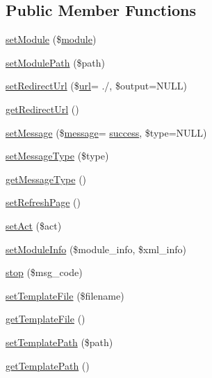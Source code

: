 \subsection*{Public Member Functions}
\begin{DoxyCompactItemize}
\item 
\hyperlink{classModuleObject_a610f40078a4c8590452eaedf794350ed}{set\+Module} (\$\hyperlink{classmodule}{module})
\item 
\hyperlink{classModuleObject_a277cebf9e472c1af7c00eab68414a567}{set\+Module\+Path} (\$path)
\item 
\hyperlink{classModuleObject_ac5126aa7f57a52e7f26b18b9040f5501}{set\+Redirect\+Url} (\$\hyperlink{swfupload_8js_a440a52a9004fdab0700100a6ddb49f67}{url}= \textquotesingle{}./\textquotesingle{}, \$output=N\+U\+LL)
\item 
\hyperlink{classModuleObject_ae7c0b4d36f7ef9e8b3ec59a6a9bf6116}{get\+Redirect\+Url} ()
\item 
\hyperlink{classModuleObject_a90eb9095539a8905d73695afbbebbe24}{set\+Message} (\$\hyperlink{classmessage}{message}= \textquotesingle{}\hyperlink{jquery_8oembed_8js_a20d50bae920793dd76c2f5b4c6fd9803}{success}\textquotesingle{}, \$type=N\+U\+LL)
\item 
\hyperlink{classModuleObject_a9f65f760815bb7c6667a2e521578af10}{set\+Message\+Type} (\$type)
\item 
\hyperlink{classModuleObject_aa0c2daa9dda892df56eb5fe7c754e25b}{get\+Message\+Type} ()
\item 
\hyperlink{classModuleObject_a6d0d3436c8c64591e1a3534647714969}{set\+Refresh\+Page} ()
\item 
\hyperlink{classModuleObject_a35d0b9120ea393d4b4177b0c667e198c}{set\+Act} (\$act)
\item 
\hyperlink{classModuleObject_afbcee54b026b35a2a4b4a454724bb9be}{set\+Module\+Info} (\$module\+\_\+info, \$xml\+\_\+info)
\item 
\hyperlink{classModuleObject_ac4c2bac7917c3ab3a0e816b99574727c}{stop} (\$msg\+\_\+code)
\item 
\hyperlink{classModuleObject_aa38e116023d54d3f5d8f507bb87663f4}{set\+Template\+File} (\$filename)
\item 
\hyperlink{classModuleObject_af5456f80bf7bd5d3c20dd6547423a419}{get\+Template\+File} ()
\item 
\hyperlink{classModuleObject_a440407bd8b6b16eb03115ad4a5c5835a}{set\+Template\+Path} (\$path)
\item 
\hyperlink{classModuleObject_a10f29d4a49d7e24bdab4e348633c6609}{get\+Template\+Path} ()

\end{DoxyCompactItemize}
